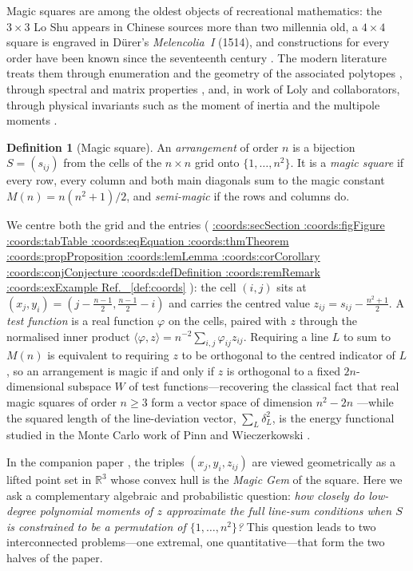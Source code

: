 \documentclass[11pt,a4paper]{article}
\makeatletter
\def\Cref@getprefix#1:#2\relax{#1}
\def\Cref@prefix@sec{sec}
\def\Cref@prefix@fig{fig}
\def\Cref@prefix@tab{tab}
\def\Cref@prefix@eq{eq}
\def\Cref@prefix@thm{thm}
\def\Cref@prefix@prop{prop}
\def\Cref@prefix@lem{lem}
\def\Cref@prefix@cor{cor}
\def\Cref@prefix@conj{conj}
\def\Cref@prefix@def{def}
\def\Cref@prefix@rem{rem}
\def\Cref@prefix@ex{ex}
\def\Cref@type@cap#1{%
  \edef\Cref@tmp{#1}%
  \ifx\Cref@tmp\Cref@prefix@sec Section%
  \else\ifx\Cref@tmp\Cref@prefix@fig Figure%
  \else\ifx\Cref@tmp\Cref@prefix@tab Table%
  \else\ifx\Cref@tmp\Cref@prefix@eq Equation%
  \else\ifx\Cref@tmp\Cref@prefix@thm Theorem%
  \else\ifx\Cref@tmp\Cref@prefix@prop Proposition%
  \else\ifx\Cref@tmp\Cref@prefix@lem Lemma%
  \else\ifx\Cref@tmp\Cref@prefix@cor Corollary%
  \else\ifx\Cref@tmp\Cref@prefix@conj Conjecture%
  \else\ifx\Cref@tmp\Cref@prefix@def Definition%
  \else\ifx\Cref@tmp\Cref@prefix@rem Remark%
  \else\ifx\Cref@tmp\Cref@prefix@ex Example%
  \else Ref.%
  \fi\fi\fi\fi\fi\fi\fi\fi\fi\fi\fi\fi
}
\DeclareRobustCommand{\Cref}[1]{%
  \begingroup
  \edef\Cref@label{#1}%
  \edef\Cref@prefix{\expandafter\Cref@getprefix\Cref@label:\relax}%
  \hyperref[#1]{\Cref@type@cap{\Cref@prefix}~\ref*{#1}}%
  \endgroup
}
\theoremstyle{plain}
\theoremstyle{definition}
\newtheorem{definition}[theorem]{Definition}
\theoremstyle{remark}
\newcommand{\R}{\mathbb{R}}
\makeatother
\begin{document}
Magic squares are among the oldest objects of recreational mathematics: the $3\times3$ Lo Shu appears in Chinese sources more than two millennia old, a $4\times4$ square is engraved in D\"urer's \emph{Melencolia~I} (1514), and constructions for every order have been known since the seventeenth century \cite{andrews1960magic,pickover2002zen}.
The modern literature treats them through enumeration and the geometry of the associated polytopes \cite{stanley1973magic,ehrhart1973magic,ahmed2003polyhedral,beck2006insideout,beck2010enumeration}, through spectral and matrix properties \cite{loly2009spectra,nordgren2012properties,nordgren2014spectra,cameron2013signatura}, and, in work of Loly and collaborators, through physical invariants such as the moment of inertia and the multipole moments \cite{loly2004invariance,rogers2004inertia,rogers2005multipole}.

\begin{definition}[Magic square]
\label{def:magic_square}
An \emph{arrangement} of order $n$ is a bijection $S=(s_{ij})$ from the cells of the $n\times n$ grid onto $\{1,\dots,n^2\}$.
It is a \emph{magic square} if every row, every column and both main diagonals sum to the magic constant $M(n)=n(n^2+1)/2$, and \emph{semi-magic} if the rows and columns do.
\end{definition}

We centre both the grid and the entries (\Cref{def:coords}): the cell $(i,j)$ sits at $(x_j,y_i)=(j-\frac{n-1}2,\frac{n-1}2-i)$ and carries the centred value $z_{ij}=s_{ij}-\frac{n^2+1}2$.
A \emph{test function} is a real function $\varphi$ on the cells, paired with $z$ through the normalised inner product $\langle\varphi,z\rangle=n^{-2}\sum_{i,j}\varphi_{ij}z_{ij}$.
Requiring a line $L$ to sum to $M(n)$ is equivalent to requiring $z$ to be orthogonal to the centred indicator of $L$, so an arrangement is magic if and only if $z$ is orthogonal to a fixed $2n$-dimensional subspace $W$ of test functions—recovering the classical fact that real magic squares of order $n\ge3$ form a vector space of dimension $n^2-2n$ \cite{ward1980vector}—while the squared length of the line-deviation vector, $\sum_L\delta_L^2$, is the energy functional studied in the Monte Carlo work of Pinn and Wieczerkowski \cite{pinn1998number}.

In the companion paper \cite{mathewson_gems}, the triples $(x_j,y_i,z_{ij})$ are viewed geometrically as a lifted point set in $\R^3$ whose convex hull is the \emph{Magic Gem} of the square. Here we ask a complementary algebraic and probabilistic question: \emph{how closely do low-degree polynomial moments of $z$ approximate the full line-sum conditions when $S$ is constrained to be a permutation of $\{1,\dots,n^2\}$?} This question leads to two interconnected problems—one extremal, one quantitative—that form the two halves of the paper.
\end{document}
